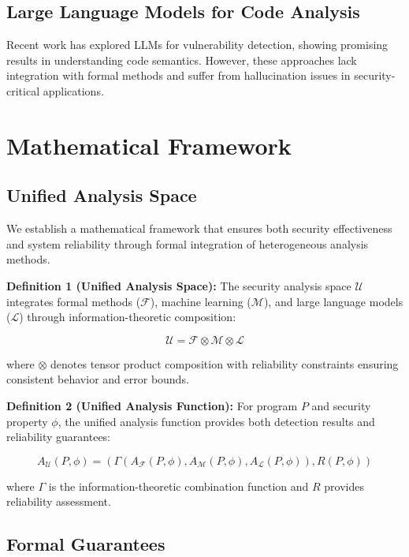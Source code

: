 \documentclass[conference,compsoc]{IEEEtran}
\begin{document}
\subsection{Large Language Models for Code Analysis}

Recent work has explored LLMs for vulnerability detection, showing promising results in understanding code semantics. However, these approaches lack integration with formal methods and suffer from hallucination issues in security-critical applications.

\section{Mathematical Framework}

\subsection{Unified Analysis Space}

We establish a mathematical framework that ensures both security effectiveness and system reliability through formal integration of heterogeneous analysis methods.

\textbf{Definition 1 (Unified Analysis Space):} The security analysis space $\mathcal{U}$ integrates formal methods ($\mathcal{F}$), machine learning ($\mathcal{M}$), and large language models ($\mathcal{L}$) through information-theoretic composition:

\begin{equation}
\mathcal{U} = \mathcal{F} \otimes \mathcal{M} \otimes \mathcal{L}
\end{equation}

where $\otimes$ denotes tensor product composition with reliability constraints ensuring consistent behavior and error bounds.

\textbf{Definition 2 (Unified Analysis Function):} For program $P$ and security property $\phi$, the unified analysis function provides both detection results and reliability guarantees:

\begin{equation}
A_{\mathcal{U}}(P, \phi) = (\Gamma(A_{\mathcal{F}}(P, \phi), A_{\mathcal{M}}(P, \phi), A_{\mathcal{L}}(P, \phi)), R(P, \phi))
\end{equation}

where $\Gamma$ is the information-theoretic combination function and $R$ provides reliability assessment.

\subsection{Formal Guarantees}
\end{document}
